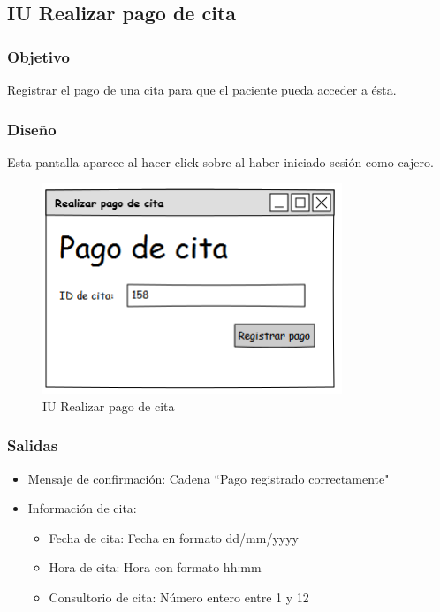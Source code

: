 \subsection{IU Realizar pago de cita}

\subsubsection{Objetivo}
Registrar el pago de una cita para que el paciente pueda acceder a ésta.

\subsubsection{Diseño}
Esta pantalla aparece al hacer click sobre  al haber iniciado sesión como cajero.

\begin{figure}[htbp!]
	\centering
	\includegraphics[width=0.8\textwidth]{images/IU_pagar_cita}
	\caption{IU Realizar pago de cita}
\end{figure}


\subsubsection{Salidas}
\begin{itemize} 
	\item Mensaje de confirmación: Cadena ``Pago registrado correctamente"
	\item Información de cita:
	\begin{itemize}
		\item Fecha de cita: Fecha en formato dd/mm/yyyy
		\item Hora de cita: Hora con formato hh:mm
		\item Consultorio de cita: Número entero entre 1 y 12
	\end{itemize}
\end{itemize}
